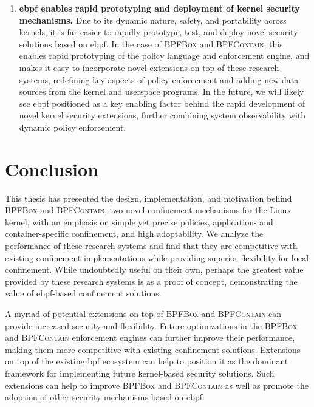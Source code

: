 \documentclass[
  fontsize=12pt,
  titlepage=firstiscover,
  paper=letter,
oneside,
  cleardoublepage=plain,
  parskip=half-,
  DIV=10,
  parindent,
  appendixprefix,
  chapterprefix,
  listof=totoc,
]{scrbook}
\newcommand{\bpfbox}{\textsc{BPFBox}}
\newcommand{\bpfcontain}{\textsc{BPFContain}}
\begin{document}
\begin{enumerate}
  \item \textbf{\gls{ebpf} enables rapid prototyping and deployment of kernel security mechanisms.}
  Due to its dynamic nature, safety, and portability across kernels, it is far easier to
  rapidly prototype, test, and deploy novel security solutions based on \gls{ebpf}. In the
  case of \bpfbox{} and \bpfcontain{}, this enables rapid prototyping of the policy
  language and enforcement engine, and makes it easy to incorporate novel extensions on
  top of these research systems, redefining key aspects of policy enforcement and adding
  new data sources from the kernel and userspace programs. In the future, we will likely see
  \gls{ebpf} positioned as a key enabling factor behind the rapid development of novel kernel
  security extensions, further combining system observability with dynamic policy enforcement.
\end{enumerate}









\section{Conclusion}
\label{s:disc-conclusion}

This thesis has presented the design, implementation, and motivation behind \bpfbox{} and
\bpfcontain{}, two novel confinement mechanisms for the Linux kernel, with an emphasis on
simple yet precise policies, application- and container-specific confinement, and high
adoptability. We analyze the performance of these research systems and find that they are
competitive with existing confinement implementations while providing superior flexibility
for local confinement. While undoubtedly useful on their own, perhaps the greatest value
provided by these research systems is as a proof of concept, demonstrating the value of
\gls{ebpf}-based confinement solutions.

A myriad of potential extensions on top of \bpfbox{} and \bpfcontain{} can provide
increased security and flexibility.  Future optimizations in the \bpfbox{} and
\bpfcontain{} enforcement engines can further improve their performance, making them more
competitive with existing confinement solutions. Extensions on top of the existing
\gls{bpf} ecosystem can help to position it as the dominant framework for implementing
future kernel-based security solutions. Such extensions can help to improve \bpfbox{} and
\bpfcontain{} as well as promote the adoption of other security mechanisms based on
\gls{ebpf}.
\end{document}
